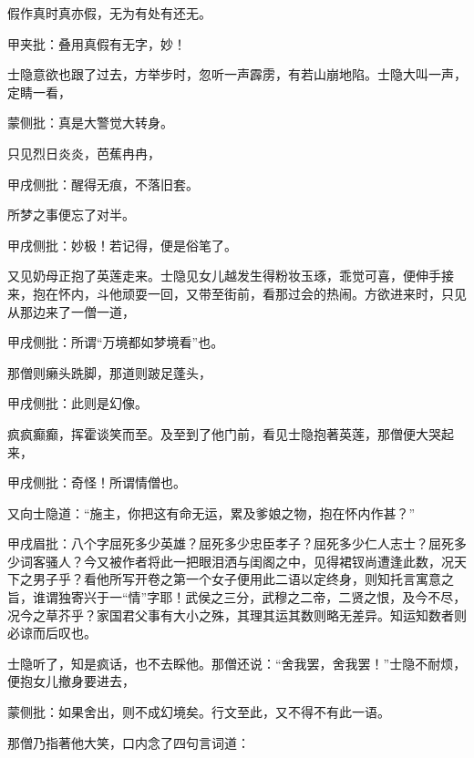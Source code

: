 \begin{poem}
    \begin{pl}假作真时真亦假，无为有处有还无。\end{pl}
    \begin{note}甲夹批：叠用真假有无字，妙！\end{note}
\end{poem}


\begin{parag}
    士隐意欲也跟了过去，方举步时，忽听一声霹雳，有若山崩地陷。士隐大叫一声，定睛一看，\begin{note}蒙侧批：真是大警觉大转身。\end{note}只见烈日炎炎，芭蕉冉冉，\begin{note}甲戌侧批：醒得无痕，不落旧套。\end{note}所梦之事便忘了对半。\begin{note}甲戌侧批：妙极！若记得，便是俗笔了。\end{note}
\end{parag}


\begin{parag}
    又见奶母正抱了英莲走来。士隐见女儿越发生得粉妆玉琢，乖觉可喜，便伸手接来，抱在怀内，斗他顽耍一回，又带至街前，看那过会的热闹。方欲进来时，只见从那边来了一僧一道，\begin{note}甲戌侧批：所谓“万境都如梦境看”也。\end{note}那僧则癞头跣脚，那道则跛足蓬头，\begin{note}甲戌侧批：此则是幻像。\end{note}疯疯癫癫，挥霍谈笑而至。及至到了他门前，看见士隐抱著英莲，那僧便大哭起来，\begin{note}甲戌侧批：奇怪！所谓情僧也。\end{note}又向士隐道：“施主，你把这有命无运，累及爹娘之物，抱在怀内作甚？”\begin{note}甲戌眉批：八个字屈死多少英雄？屈死多少忠臣孝子？屈死多少仁人志士？屈死多少词客骚人？今又被作者将此一把眼泪洒与闺阁之中，见得裙钗尚遭逢此数，况天下之男子乎？看他所写开卷之第一个女子便用此二语以定终身，则知托言寓意之旨，谁谓独寄兴于一“情”字耶！武侯之三分，武穆之二帝，二贤之恨，及今不尽，况今之草芥乎？家国君父事有大小之殊，其理其运其数则略无差异。知运知数者则必谅而后叹也。\end{note}士隐听了，知是疯话，也不去睬他。那僧还说：“舍我罢，舍我罢！”士隐不耐烦，便抱女儿撤身要进去，\begin{note}蒙侧批：如果舍出，则不成幻境矣。行文至此，又不得不有此一语。\end{note}那僧乃指著他大笑，口内念了四句言词道：
\end{parag}


